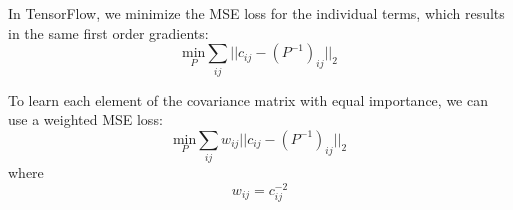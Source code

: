 \documentclass[11pt]{article}
\begin{document}
In TensorFlow, we minimize the MSE loss for the individual terms, which results in the same first order gradients:
\begin{equation}
\underset{P}{\text{min}} \sum_{ij} \Big | \Big | c_{ij} - (P^{-1})_{ij} \Big | \Big |_2
\end{equation}

To learn each element of the covariance matrix with equal importance, we can use a weighted MSE loss:
\begin{equation}
\underset{P}{\text{min}} \sum_{ij} w_{ij} \Big | \Big | c_{ij} - (P^{-1})_{ij} \Big | \Big |_2
\end{equation}
where
\begin{equation}
w_{ij} = c_{ij}^{-2}
\end{equation}
\end{document}
